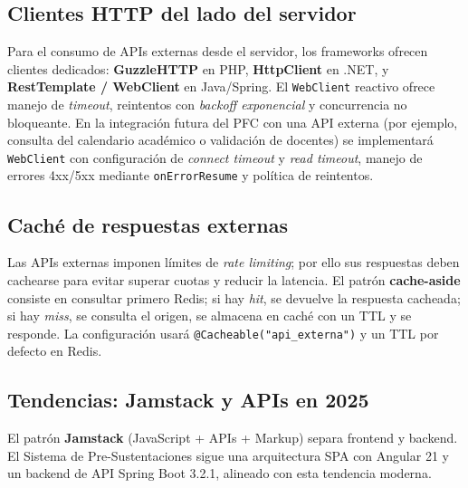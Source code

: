 \subsection{Clientes HTTP del lado del servidor}

Para el consumo de APIs externas desde el servidor, los frameworks ofrecen clientes dedicados: \textbf{GuzzleHTTP}
en PHP, \textbf{HttpClient} en .NET, y \textbf{RestTemplate / WebClient} en Java/Spring. El \texttt{WebClient}
reactivo ofrece manejo de \textit{timeout}, reintentos con \textit{backoff exponencial} y concurrencia no
bloqueante. En la integración futura del PFC con una API externa (por ejemplo, consulta del calendario académico o
validación de docentes) se implementará \texttt{WebClient} con configuración de \textit{connect timeout} y
\textit{read timeout}, manejo de errores 4xx/5xx mediante \texttt{onErrorResume} y política de reintentos.

\subsection{Caché de respuestas externas}

Las APIs externas imponen límites de \textit{rate limiting}; por ello sus respuestas deben cachearse para evitar
superar cuotas y reducir la latencia. El patrón \textbf{cache-aside} consiste en consultar primero Redis; si hay
\textit{hit}, se devuelve la respuesta cacheada; si hay \textit{miss}, se consulta el origen, se almacena en
caché con un TTL y se responde. La configuración usará \texttt{@Cacheable("api\_externa")} y un TTL por defecto en Redis.

\subsection{Tendencias: Jamstack y APIs en 2025}

El patrón \textbf{Jamstack} (JavaScript + APIs + Markup) separa frontend y backend. El Sistema de Pre-Sustentaciones
sigue una arquitectura SPA con Angular 21 y un backend de API Spring Boot 3.2.1, alineado con esta tendencia moderna.
